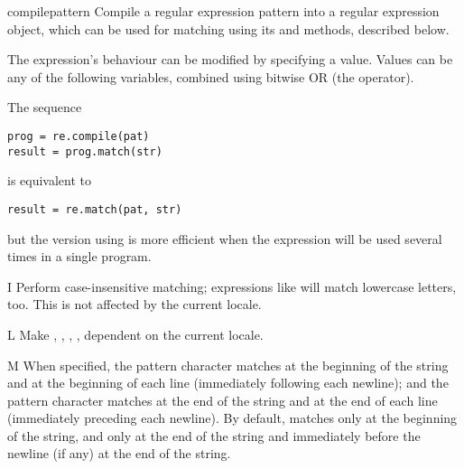 \begin{funcdesc}{compile}{pattern}
  Compile a regular expression pattern into a regular expression
  object, which can be used for matching using its  and
   methods, described below.  

  The expression's behaviour can be modified by specifying a
   value.  Values can be any of the following variables,
  combined using bitwise OR (the \code{|} operator).

The sequence

\begin{verbatim}
prog = re.compile(pat)
result = prog.match(str)
\end{verbatim}

is equivalent to

\begin{verbatim}
result = re.match(pat, str)
\end{verbatim}

but the version using  is more efficient when the
expression will be used several times in a single program.
\end{funcdesc}

\begin{datadesc}{I}
Perform case-insensitive matching; expressions like \regexp{[A-Z]} will match
lowercase letters, too.  This is not affected by the current locale.
\end{datadesc}

\begin{datadesc}{L}
Make , , ,
, dependent on the current locale. 
\end{datadesc}

\begin{datadesc}{M}
When specified, the pattern character \character{\^} matches at the
beginning of the string and at the beginning of each line
(immediately following each newline); and the pattern character
\character{\$} matches at the end of the string and at the end of each line
(immediately preceding each newline).
By default, \character{\^} matches only at the beginning of the string, and
\character{\$} only at the end of the string and immediately before the
newline (if any) at the end of the string. 
\end{datadesc}

